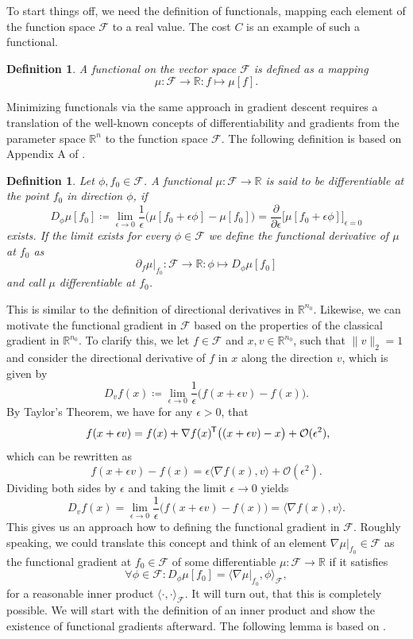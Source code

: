 \documentclass[11pt, a4paper]{article}
\newtheorem{definition}[theorem]{Definition}
\newcommand{\R}{\mathbb{R}}
\newcommand{\F}{\mathcal{F}}
\renewcommand{\O}{\mathcal{O}}
\newcommand*{\tr}{^{\mkern-1.5mu\mathsf{T}}}
\begin{document}
To start things off, we need the definition of functionals, mapping each element of the function space $\F$ to a real value. The cost $C$ is an example of such a functional.

\begin{definition}
A functional on the vector space $\F$ is defined as a mapping
\[ \mu: \F \to \R : f \mapsto \mu[f]. \]
\end{definition}

Minimizing functionals via the same approach in gradient descent requires a translation of the well-known concepts of differentiability and gradients from the parameter space $\R^n$ to the function space $\F$. The following definition is based on Appendix A of \cite{Functionals}.

\begin{definition}
Let $\phi, f_0 \in \F$. A functional $\mu : \F \to \R$ is said to be differentiable at the point $f_0$ in direction $\phi$, if
\[ D_\phi\mu[f_0] \coloneq \lim_{\epsilon \to 0} \frac{1}{\epsilon} \Big ( \mu[f_0 + \epsilon \phi] - \mu[f_0] \Big ) = \frac{\partial}{\partial \epsilon} \Big [ \mu[f_0+\epsilon \phi] \Big ]_{\epsilon=0} \]
exists. If the limit exists for every $\phi \in \F$ we define the functional derivative of $\mu$ at $f_0$ as
\[ \partial_{f} \mu |_{f_0} : \F \to \R : \phi \mapsto D_\phi\mu[f_0] \]
and call $\mu$ differentiable at $f_0$.
\end{definition}

This is similar to the definition of directional derivatives in $\R^{n_0}$. Likewise, we can motivate the functional gradient in $\F$ based on the properties of the classical gradient in $\R^{n_0}$. To clarify this, we let $f \in \F$ and $x,v \in \R^{n_0}$, such that $\| v \|_2 = 1$ and consider the directional derivative of $f$ in $x$ along the direction $v$, which is given by
\[ D_vf(x) \coloneq \lim_{\epsilon \to 0} \frac{1}{\epsilon} \Big ( f(x + \epsilon v) - f(x) \Big ). \]
By Taylor's Theorem, we have for any $\epsilon > 0$, that 
\[ f(x+\epsilon v) = f(x) + \nabla f(x) \tr \big ((x + \epsilon v) - x \big ) + \O(\epsilon^2), \]
which can be rewritten as
\[ f(x + \epsilon v ) - f(x) = \epsilon \big \langle \nabla f(x), v \big \rangle + \O (\epsilon^2). \]
Dividing both sides by $\epsilon$ and taking the limit $\epsilon \to 0$ yields
\[ D_vf(x) =  \lim_{\epsilon \to 0} \frac{1}{\epsilon} \Big ( f(x + \epsilon v) - f(x) \Big ) = \big \langle \nabla f(x), v \big \rangle. \]
This gives us an approach how to defining the functional gradient in $\F$. Roughly speaking, we could translate this concept and think of an element $\nabla \mu |_{f_0} \in \F $ as the functional gradient at $f_0 \in \F$ of some differentiable $\mu: \F \to \R$ if it satisfies
\[ \forall \phi \in \F : D_\phi\mu[f_0] = \big \langle \nabla \mu |_{f_0}, \phi \big \rangle_\F, \]
for a reasonable inner product $\langle \cdot, \cdot \rangle_\F$. It will turn out, that this is completely possible. We will start with the definition of an inner product and show the existence of functional gradients afterward. The following lemma is based on \cite{NTK}.
\end{document}
